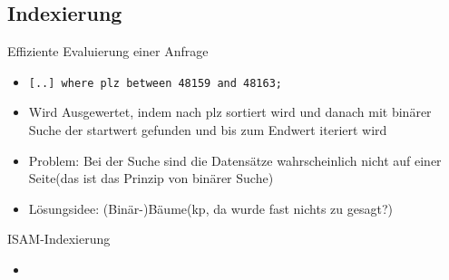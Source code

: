\documentclass{article}
\begin{document}
\subsection*{Indexierung}

\begin{block}{Effiziente Evaluierung einer Anfrage}
  \begin{itemize}
    \item \texttt{[..] where plz between 48159 and 48163;}
    \item Wird Ausgewertet, indem nach plz sortiert wird und danach mit binärer Suche der startwert gefunden und bis zum Endwert iteriert wird
    \item Problem: Bei der Suche sind die Datensätze wahrscheinlich nicht auf einer Seite(das ist das Prinzip von binärer Suche)
    \item Lösungsidee: (Binär-)Bäume(kp, da wurde fast nichts zu gesagt?)
  \end{itemize}
\end{block}

\begin{block}{ISAM-Indexierung}
  \begin{itemize}
    \item 
  \end{itemize}
\end{block}
\end{document}
